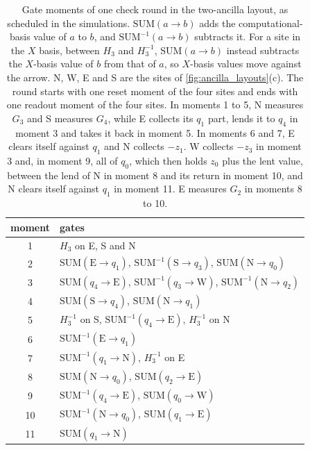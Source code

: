 \begin{table}[htb]
  \centering
  \small
  \begin{tabular}{c|l}
    \hline
    moment & gates \\
    \hline
    1 & $H_3$ on E, S and N \\
    2 & $\mathrm{SUM}(\mathrm{E} \to q_1)$, $\mathrm{SUM}^{-1}(\mathrm{S} \to q_3)$, $\mathrm{SUM}(\mathrm{N} \to q_0)$ \\
    3 & $\mathrm{SUM}(q_4 \to \mathrm{E})$, $\mathrm{SUM}^{-1}(q_3 \to \mathrm{W})$, $\mathrm{SUM}^{-1}(\mathrm{N} \to q_2)$ \\
    4 & $\mathrm{SUM}(\mathrm{S} \to q_4)$, $\mathrm{SUM}(\mathrm{N} \to q_1)$ \\
    5 & $H_3^{-1}$ on S, $\mathrm{SUM}^{-1}(q_4 \to \mathrm{E})$, $H_3^{-1}$ on N \\
    6 & $\mathrm{SUM}^{-1}(\mathrm{E} \to q_1)$ \\
    7 & $\mathrm{SUM}^{-1}(q_1 \to \mathrm{N})$, $H_3^{-1}$ on E \\
    8 & $\mathrm{SUM}(\mathrm{N} \to q_0)$, $\mathrm{SUM}(q_2 \to \mathrm{E})$ \\
    9 & $\mathrm{SUM}^{-1}(q_4 \to \mathrm{E})$, $\mathrm{SUM}(q_0 \to \mathrm{W})$ \\
    10 & $\mathrm{SUM}^{-1}(\mathrm{N} \to q_0)$, $\mathrm{SUM}(q_1 \to \mathrm{E})$ \\
    11 & $\mathrm{SUM}(q_1 \to \mathrm{N})$ \\
    \hline
  \end{tabular}
  \caption{Gate moments of one check round in the two-ancilla layout, as scheduled in the simulations. $\mathrm{SUM}(a \to b)$ adds the computational-basis value of $a$ to $b$, and $\mathrm{SUM}^{-1}(a \to b)$ subtracts it. For a site in the $X$ basis, between $H_3$ and $H_3^{-1}$, $\mathrm{SUM}(a \to b)$ instead subtracts the $X$-basis value of $b$ from that of $a$, so $X$-basis values move against the arrow. N, W, E and S are the sites of \autoref{fig:ancilla_layouts}(c). The round starts with one reset moment of the four sites and ends with one readout moment of the four sites. In moments 1 to 5, N measures $G_3$ and S measures $G_4$, while E collects its $q_1$ part, lends it to $q_4$ in moment 3 and takes it back in moment 5. In moments 6 and 7, E clears itself against $q_1$ and N collects $-z_1$. W collects $-z_3$ in moment 3 and, in moment 9, all of $q_0$, which then holds $z_0$ plus the lent value, between the lend of N in moment 8 and its return in moment 10, and N clears itself against $q_1$ in moment 11. E measures $G_2$ in moments 8 to 10.}
  \label{tab:conv_round}
\end{table}

